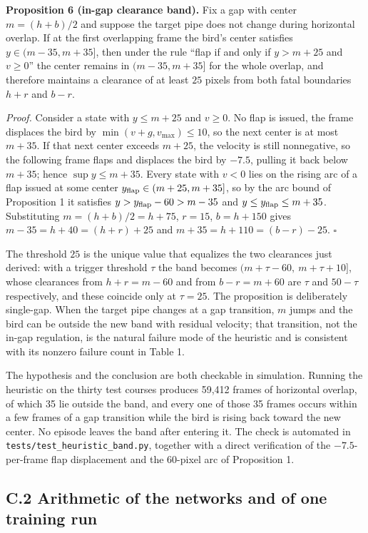 \documentclass[
  11pt,
]{article}
\begin{document}
\textbf{Proposition 6 (in-gap clearance band).} Fix a gap with center
\(m=(h+b)/2\) and suppose the target pipe does not change during
horizontal overlap. If at the first overlapping frame the bird's center
satisfies \(y\in(m-35,m+35]\), then under the rule ``flap if and only if
\(y>m+25\) and \(v\ge0\)'' the center remains in \((m-35,m+35]\) for the
whole overlap, and therefore maintains a clearance of at least \(25\)
pixels from both fatal boundaries \(h+r\) and \(b-r\).

\emph{Proof.} Consider a state with \(y\le m+25\) and \(v\ge0\). No flap
is issued, the frame displaces the bird by \(\min(v+g,v_{\max})\le10\),
so the next center is at most \(m+35\). If that next center exceeds
\(m+25\), the velocity is still nonnegative, so the following frame
flaps and displaces the bird by \(-7.5\), pulling it back below
\(m+35\); hence \(\sup y\le m+35\). Every state with \(v<0\) lies on the
rising arc of a flap issued at some center
\(y_{\rm flap}\in(m+25,m+35]\), so by the arc bound of Proposition 1 it
satisfies \(y>y_{\rm flap}-60>m-35\) and \(y\le y_{\rm flap}\le m+35\).
Substituting \(m=(h+b)/2=h+75\), \(r=15\), \(b=h+150\) gives
\(m-35=h+40=(h+r)+25\) and \(m+35=h+110=(b-r)-25\). \(\square\)

The threshold \(25\) is the unique value that equalizes the two
clearances just derived: with a trigger threshold \(\tau\) the band
becomes \((m+\tau-60,\ m+\tau+10]\), whose clearances from \(h+r=m-60\)
and from \(b-r=m+60\) are \(\tau\) and \(50-\tau\) respectively, and
these coincide only at \(\tau=25\). The proposition is deliberately
single-gap. When the target pipe changes at a gap transition, \(m\)
jumps and the bird can be outside the new band with residual velocity;
that transition, not the in-gap regulation, is the natural failure mode
of the heuristic and is consistent with its nonzero failure count in
Table 1.

The hypothesis and the conclusion are both checkable in simulation.
Running the heuristic on the thirty test courses produces 59,412 frames
of horizontal overlap, of which 35 lie outside the band, and every one
of those 35 frames occurs within a few frames of a gap transition while
the bird is rising back toward the new center. No episode leaves the
band after entering it. The check is automated in
\texttt{tests/test\_heuristic\_band.py}, together with a direct
verification of the \(-7.5\)-per-frame flap displacement and the
60-pixel arc of Proposition 1.

\subsection{C.2 Arithmetic of the networks and of one training
run}\label{c.2-arithmetic-of-the-networks-and-of-one-training-run}
\end{document}
